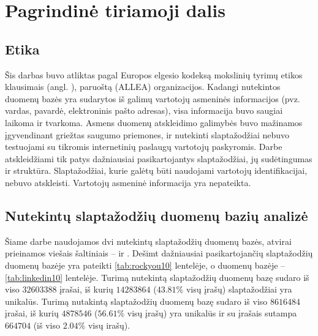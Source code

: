 \documentclass{VUMIFInfBakalaurinis}
\begin{document}
\section{Pagrindinė tiriamoji dalis}
\subsection{Etika}
Šis darbas buvo atliktas pagal Europos elgesio kodeksą mokslinių tyrimų etikos 
klausimais
(angl. ), paruoštą 
 (ALLEA) 
organizacijos. Kadangi nutekintos duomenų bazės yra sudarytos iš galimų 
vartotojų asmeninės informacijos (pvz. vardas, pavardė, elektroninis pašto 
adresas), visa informacija buvo saugiai laikoma ir tvarkoma. Asmens duomenų 
atskleidimo galimybės buvo mažinamos įgyvendinant griežtas saugumo priemones, ir 
nutekinti slaptažodžiai nebuvo testuojami su tikromis internetinių paslaugų 
vartotojų paskyromis. Darbe atskleidžiami tik patys dažniausiai pasikartojantys 
slaptažodžiai, jų sudėtingumas ir struktūra. Slaptažodžiai, kurie galėtų būti 
naudojami vartotojų identifikacijai, nebuvo atskleisti. Vartotojų asmeninė 
informacija yra nepateikta.

\subsection{Nutekintų slaptažodžių duomenų bazių analizė} \label{sec:db-analize}
Šiame darbe naudojamos dvi nutekintų slaptažodžių duomenų bazės, atvirai 
prieinamos viešais šaltiniais --  ir . 
Dešimt dažniausiai pasikartojančių slaptažodžių duomenų bazėje 
 yra pateikti \ref{tab:rockyou10} lentelėje, o duomenų bazėje 
 -- \ref{tab:linkedin10} lentelėje. Turimą 
 nutekintą slaptažodžių duomenų bazę sudaro iš viso 
$32603388$ įrašai, iš kurių $14283864$ ($43.81 \%$ visų įrašų) slaptažodžiai yra 
unikalūs. Turimą  nutakintą slaptažodžių duomenų bazę sudaro 
iš viso $8616484$ įrašai, iš kurių $4878546$ ($56.61 \%$ visų įrašų) yra 
unikalūs ir su  įrašais sutampa $664704$ (iš viso $2.04 \%$ 
visų  irašų).
\end{document}
